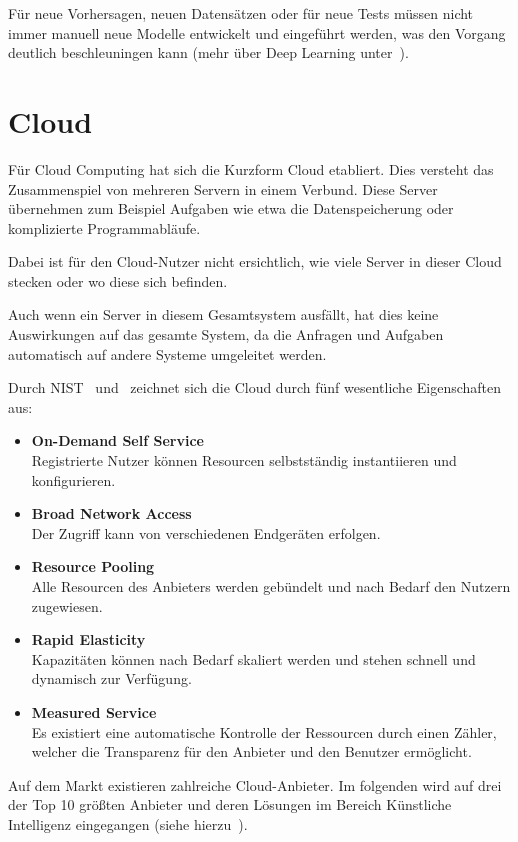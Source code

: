 Für neue Vorhersagen, neuen Datensätzen oder für neue Tests müssen nicht immer manuell neue Modelle entwickelt und
eingeführt werden, was den Vorgang deutlich beschleuningen kann (mehr über Deep Learning
unter~\cite{book_grundlagen_machinelearning}).

\section{Cloud}
Für Cloud Computing hat sich die Kurzform Cloud etabliert. Dies versteht das Zusammenspiel von mehreren Servern in einem
Verbund. Diese Server übernehmen zum Beispiel Aufgaben wie etwa die Datenspeicherung oder komplizierte Programmabläufe.

Dabei ist für den Cloud-Nutzer nicht ersichtlich, wie viele Server in dieser Cloud stecken oder wo diese sich befinden.

Auch wenn ein Server in diesem Gesamtsystem ausfällt, hat dies keine Auswirkungen auf das gesamte System, da die
Anfragen und Aufgaben automatisch auf andere Systeme umgeleitet werden.

Durch NIST~\cite{online_grundlagen_cloud_nist} und~\cite{online_grundlagen_cloud_computing} zeichnet sich die Cloud
durch fünf wesentliche Eigenschaften aus:

\begin{itemize}
    \item \textbf{On-Demand Self Service} \\
    Registrierte Nutzer können Resourcen selbstständig instantiieren und konfigurieren.
    \item \textbf{Broad Network Access} \\
    Der Zugriff kann von verschiedenen Endgeräten erfolgen.
    \item \textbf{Resource Pooling} \\
    Alle Resourcen des Anbieters werden gebündelt und nach Bedarf den Nutzern zugewiesen.
    \item \textbf{Rapid Elasticity} \\
    Kapazitäten können nach Bedarf skaliert werden und stehen schnell und dynamisch zur Verfügung.
    \item \textbf{Measured Service} \\
    Es existiert eine automatische Kontrolle der Ressourcen durch einen Zähler, welcher die Transparenz für den
    Anbieter und den Benutzer ermöglicht.
\end{itemize}

Auf dem Markt existieren zahlreiche Cloud-Anbieter. Im folgenden wird auf drei der Top 10 größten Anbieter und deren
Lösungen im Bereich Künstliche Intelligenz eingegangen (siehe hierzu~\cite{online_grundlagen_cloud}).

